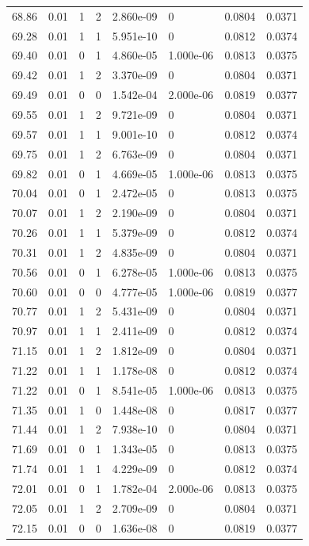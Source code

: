 \documentclass[preview]{standalone}
\begin{document}
{{{{{{{{{{\begin{tabular}{L{1.2cm}C{1.2cm} C{0.3cm}C{0.5cm} C{1.4cm}C{1.4cm} C{1.4cm}C{1.4cm}}
  68.86  &  0.01  & 1     &  2 &  2.860e-09  & 0  & 0.0804 &  0.0371   \\ 
  69.28  &  0.01  & 1     &  1 &  5.951e-10  & 0  & 0.0812 &  0.0374   \\ 
  69.40  &  0.01  & 0     &  1 &  4.860e-05  & 1.000e-06  & 0.0813 &  0.0375   \\ 
  69.42  &  0.01  & 1     &  2 &  3.370e-09  & 0  & 0.0804 &  0.0371   \\ 
  69.49  &  0.01  & 0     &  0 &  1.542e-04  & 2.000e-06  & 0.0819 &  0.0377   \\ 
  69.55  &  0.01  & 1     &  2 &  9.721e-09  & 0  & 0.0804 &  0.0371   \\ 
  69.57  &  0.01  & 1     &  1 &  9.001e-10  & 0  & 0.0812 &  0.0374   \\ 
  69.75  &  0.01  & 1     &  2 &  6.763e-09  & 0  & 0.0804 &  0.0371   \\ 
  69.82  &  0.01  & 0     &  1 &  4.669e-05  & 1.000e-06  & 0.0813 &  0.0375   \\ 
  70.04  &  0.01  & 0     &  1 &  2.472e-05  & 0  & 0.0813 &  0.0375   \\ 
  70.07  &  0.01  & 1     &  2 &  2.190e-09  & 0  & 0.0804 &  0.0371   \\ 
  70.26  &  0.01  & 1     &  1 &  5.379e-09  & 0  & 0.0812 &  0.0374   \\ 
  70.31  &  0.01  & 1     &  2 &  4.835e-09  & 0  & 0.0804 &  0.0371   \\ 
  70.56  &  0.01  & 0     &  1 &  6.278e-05  & 1.000e-06  & 0.0813 &  0.0375   \\ 
  70.60  &  0.01  & 0     &  0 &  4.777e-05  & 1.000e-06  & 0.0819 &  0.0377   \\ 
  70.77  &  0.01  & 1     &  2 &  5.431e-09  & 0  & 0.0804 &  0.0371   \\ 
  70.97  &  0.01  & 1     &  1 &  2.411e-09  & 0  & 0.0812 &  0.0374   \\ 
  71.15  &  0.01  & 1     &  2 &  1.812e-09  & 0  & 0.0804 &  0.0371   \\ 
  71.22  &  0.01  & 1     &  1 &  1.178e-08  & 0  & 0.0812 &  0.0374   \\ 
  71.22  &  0.01  & 0     &  1 &  8.541e-05  & 1.000e-06  & 0.0813 &  0.0375   \\ 
  71.35  &  0.01  & 1     &  0 &  1.448e-08  & 0  & 0.0817 &  0.0377   \\ 
  71.44  &  0.01  & 1     &  2 &  7.938e-10  & 0  & 0.0804 &  0.0371   \\ 
  71.69  &  0.01  & 0     &  1 &  1.343e-05  & 0  & 0.0813 &  0.0375   \\ 
  71.74  &  0.01  & 1     &  1 &  4.229e-09  & 0  & 0.0812 &  0.0374   \\ 
  72.01  &  0.01  & 0     &  1 &  1.782e-04  & 2.000e-06  & 0.0813 &  0.0375   \\ 
  72.05  &  0.01  & 1     &  2 &  2.709e-09  & 0  & 0.0804 &  0.0371   \\ 
  72.15  &  0.01  & 0     &  0 &  1.636e-08  & 0  & 0.0819 &  0.0377   \\ 
\hline 
\end{tabular} 

}}}}}}}}}}
\end{document}
